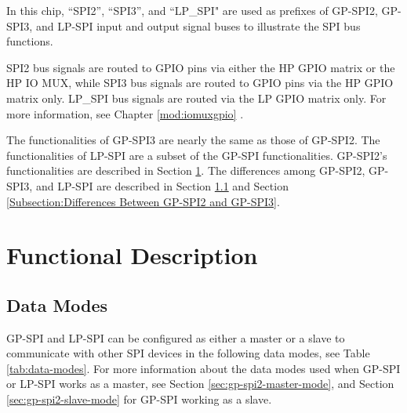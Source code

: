 \documentclass[main\_\_EN.tex]{subfiles}
\begin{document}
In this chip, ``SPI2”, ``SPI3”, and ``LP\_SPI" are used as prefixes of GP-SPI2, GP-SPI3, and LP-SPI input and output signal buses to illustrate the SPI bus functions.

SPI2 bus signals are routed to GPIO pins via either the HP GPIO matrix or the HP IO MUX, while SPI3 bus signals are routed to GPIO pins via the HP GPIO matrix only. LP\_SPI bus signals are routed via the LP GPIO matrix only. For more information, see Chapter \ref{mod:iomuxgpio} \textit{}.

The functionalities of GP-SPI3 are nearly the same as those of GP-SPI2. The functionalities of LP-SPI are a subset of the GP-SPI functionalities. GP-SPI2’s functionalities are described in Section \ref{sec:gp-spi-interfaces}. The differences among GP-SPI2, GP-SPI3, and LP-SPI are described in Section \ref{Subsection:data-modes} and Section \ref{Subsection:Differences Between GP-SPI2 and GP-SPI3}.

\section{Functional Description}\label{sec:gp-spi-interfaces}

\subsection{Data Modes}\label{Subsection:data-modes}
GP-SPI and LP-SPI can be configured as either a master or a slave to communicate with other SPI devices in the following data modes, see Table \ref{tab:data-modes}. For more information about the data modes used when GP-SPI or LP-SPI works as a master, see Section \ref{sec:gp-spi2-master-mode}, and Section \ref{sec:gp-spi2-slave-mode} for GP-SPI working as a slave.
\end{document}
